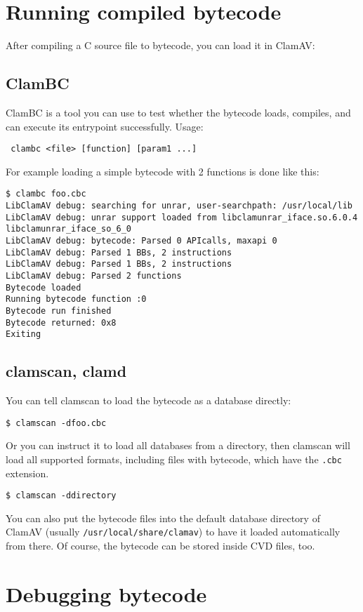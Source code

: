 \section{Running compiled bytecode}
After compiling a C source file to bytecode, you can load it in ClamAV:
\subsection{ClamBC}
ClamBC is a tool you can use to test whether the bytecode loads, compiles, and can execute its entrypoint successfully.
Usage:
\begin{verbatim}
 clambc <file> [function] [param1 ...]
\end{verbatim}

For example loading a simple bytecode with 2 functions is done like this:
\begin{verbatim}
$ clambc foo.cbc
LibClamAV debug: searching for unrar, user-searchpath: /usr/local/lib
LibClamAV debug: unrar support loaded from libclamunrar_iface.so.6.0.4 libclamunrar_iface_so_6_0
LibClamAV debug: bytecode: Parsed 0 APIcalls, maxapi 0
LibClamAV debug: Parsed 1 BBs, 2 instructions
LibClamAV debug: Parsed 1 BBs, 2 instructions
LibClamAV debug: Parsed 2 functions
Bytecode loaded
Running bytecode function :0
Bytecode run finished
Bytecode returned: 0x8
Exiting
\end{verbatim}

\subsection{clamscan, clamd}
You can tell clamscan to load the bytecode as a database directly:
\begin{verbatim}
$ clamscan -dfoo.cbc
\end{verbatim}
Or you can instruct it to load all databases from a directory, then clamscan will
load all supported formats, including files with bytecode, which have the \verb+.cbc+ extension.
\begin{verbatim}
$ clamscan -ddirectory
\end{verbatim}

You can also put the bytecode files into the default database directory of ClamAV
(usually \verb+/usr/local/share/clamav+) to have it loaded automatically from there.
Of course, the bytecode can be stored inside CVD files, too.

\section{Debugging bytecode}
